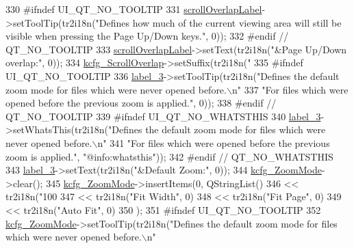 \begin{DoxyCode}
330 \textcolor{preprocessor}{#ifndef UI\_QT\_NO\_TOOLTIP}
331         \hyperlink{classUi__DlgGeneralBase_afd8162f00985b598c6b44fea18d59add}{scrollOverlapLabel}->setToolTip(tr2i18n(\textcolor{stringliteral}{"Defines how much of the current viewing
       area will still be visible when pressing the Page Up/Down keys."}, 0));
332 \textcolor{preprocessor}{#endif // QT\_NO\_TOOLTIP}
333         \hyperlink{classUi__DlgGeneralBase_afd8162f00985b598c6b44fea18d59add}{scrollOverlapLabel}->setText(tr2i18n(\textcolor{stringliteral}{"&Page Up/Down overlap:"}, 0));
334         \hyperlink{classUi__DlgGeneralBase_aa5ddc567f8fc39c1a159749c0c4bd718}{kcfg\_ScrollOverlap}->setSuffix(tr2i18n(\textcolor{stringliteral}{"%
335 \textcolor{preprocessor}{#ifndef UI\_QT\_NO\_TOOLTIP}
336         \hyperlink{classUi__DlgGeneralBase_a0b095fda3a8dd7228b68c9fe8515afe3}{label\_3}->setToolTip(tr2i18n(\textcolor{stringliteral}{"Defines the default zoom mode for files which were never opened
       before.\(\backslash\)n"}
337 \textcolor{stringliteral}{"For files which were opened before the previous zoom is applied."}, 0));
338 \textcolor{preprocessor}{#endif // QT\_NO\_TOOLTIP}
339 \textcolor{preprocessor}{#ifndef UI\_QT\_NO\_WHATSTHIS}
340         \hyperlink{classUi__DlgGeneralBase_a0b095fda3a8dd7228b68c9fe8515afe3}{label\_3}->setWhatsThis(tr2i18n(\textcolor{stringliteral}{"Defines the default zoom mode for files which were never
       opened before.\(\backslash\)n"}
341 \textcolor{stringliteral}{"For files which were opened before the previous zoom is applied."}, \textcolor{stringliteral}{"@info:whatsthis"}));
342 \textcolor{preprocessor}{#endif // QT\_NO\_WHATSTHIS}
343         \hyperlink{classUi__DlgGeneralBase_a0b095fda3a8dd7228b68c9fe8515afe3}{label\_3}->setText(tr2i18n(\textcolor{stringliteral}{"&Default Zoom:"}, 0));
344         \hyperlink{classUi__DlgGeneralBase_af20043c0fdfcbff439c8741e096ac60a}{kcfg\_ZoomMode}->clear();
345         \hyperlink{classUi__DlgGeneralBase_af20043c0fdfcbff439c8741e096ac60a}{kcfg\_ZoomMode}->insertItems(0, QStringList()
346          << tr2i18n(\textcolor{stringliteral}{"100%
347          << tr2i18n(\textcolor{stringliteral}{"Fit Width"}, 0)
348          << tr2i18n(\textcolor{stringliteral}{"Fit Page"}, 0)
349          << tr2i18n(\textcolor{stringliteral}{"Auto Fit"}, 0)
350         );
351 \textcolor{preprocessor}{#ifndef UI\_QT\_NO\_TOOLTIP}
352         \hyperlink{classUi__DlgGeneralBase_af20043c0fdfcbff439c8741e096ac60a}{kcfg\_ZoomMode}->setToolTip(tr2i18n(\textcolor{stringliteral}{"Defines the default zoom mode for files which were
       never opened before.\(\backslash\)n"}
}}
\end{DoxyCode}
